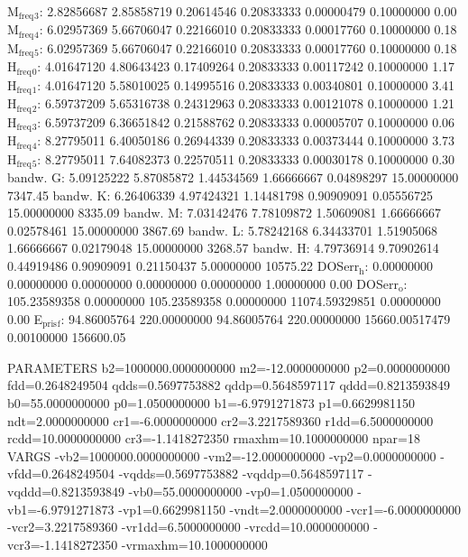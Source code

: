 \documentclass[11pt]{article}
\begin{document}
M\(_{\text{freq}}\)\(_{\text{3}}\):   2.82856687   2.85858719   0.20614546   0.20833333   0.00000479   0.10000000         0.00
M\(_{\text{freq}}\)\(_{\text{4}}\):   6.02957369   5.66706047   0.22166010   0.20833333   0.00017760   0.10000000         0.18
M\(_{\text{freq}}\)\(_{\text{5}}\):   6.02957369   5.66706047   0.22166010   0.20833333   0.00017760   0.10000000         0.18
H\(_{\text{freq}}\)\(_{\text{0}}\):   4.01647120   4.80643423   0.17409264   0.20833333   0.00117242   0.10000000         1.17
H\(_{\text{freq}}\)\(_{\text{1}}\):   4.01647120   5.58010025   0.14995516   0.20833333   0.00340801   0.10000000         3.41
H\(_{\text{freq}}\)\(_{\text{2}}\):   6.59737209   5.65316738   0.24312963   0.20833333   0.00121078   0.10000000         1.21
H\(_{\text{freq}}\)\(_{\text{3}}\):   6.59737209   6.36651842   0.21588762   0.20833333   0.00005707   0.10000000         0.06
H\(_{\text{freq}}\)\(_{\text{4}}\):   8.27795011   6.40050186   0.26944339   0.20833333   0.00373444   0.10000000         3.73
H\(_{\text{freq}}\)\(_{\text{5}}\):   8.27795011   7.64082373   0.22570511   0.20833333   0.00030178   0.10000000         0.30
bandw. G:   5.09125222   5.87085872   1.44534569   1.66666667   0.04898297  15.00000000      7347.45
bandw. K:   6.26406339   4.97424321   1.14481798   0.90909091   0.05556725  15.00000000      8335.09
bandw. M:   7.03142476   7.78109872   1.50609081   1.66666667   0.02578461  15.00000000      3867.69
bandw. L:   5.78242168   6.34433701   1.51905068   1.66666667   0.02179048  15.00000000      3268.57
bandw. H:   4.79736914   9.70902614   0.44919486   0.90909091   0.21150437   5.00000000     10575.22
DOSerr\(_{\text{h}}\):   0.00000000   0.00000000   0.00000000   0.00000000   0.00000000   1.00000000         0.00
DOSerr\(_{\text{o}}\): 105.23589358   0.00000000 105.23589358   0.00000000 11074.59329851   0.00000000         0.00
E\(_{\text{pris}}\)\(_{\text{f}}\):  94.86005764 220.00000000  94.86005764 220.00000000 15660.00517479
0.00100000    156600.05


PARAMETERS
  b2=1000000.0000000000 m2=-12.0000000000 p2=0.0000000000 fdd=0.2648249504 qdds=0.5697753882 qddp=0.5648597117 qddd=0.8213593849 b0=55.0000000000 p0=1.0500000000 b1=-6.9791271873 p1=0.6629981150 ndt=2.0000000000 cr1=-6.0000000000 cr2=3.2217589360 r1dd=6.5000000000 rcdd=10.0000000000 cr3=-1.1418272350 rmaxhm=10.1000000000 npar=18 
VARGS
    -vb2=1000000.0000000000 -vm2=-12.0000000000 -vp2=0.0000000000 -vfdd=0.2648249504 -vqdds=0.5697753882 -vqddp=0.5648597117 -vqddd=0.8213593849 -vb0=55.0000000000 -vp0=1.0500000000 -vb1=-6.9791271873 -vp1=0.6629981150 -vndt=2.0000000000 -vcr1=-6.0000000000 -vcr2=3.2217589360 -vr1dd=6.5000000000 -vrcdd=10.0000000000 -vcr3=-1.1418272350 -vrmaxhm=10.1000000000 
\end{document}
